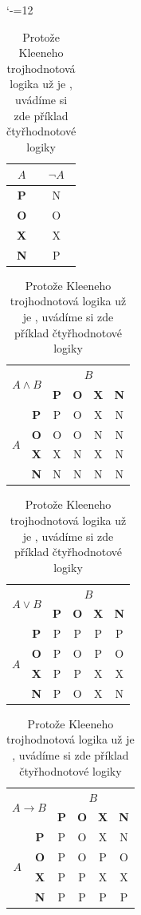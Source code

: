 \documentclass[a4paper, 11pt]{article}
\begin{document}
\begin{table}[h] 
\centering 
\catcode`-=12
\begin{tabular}{|c|c|}
\hline
$A$        & $\neg A$ \\ \hline
\textbf{P} & N        \\ \hline
\textbf{O} & O        \\ \hline
\textbf{X} & X        \\ \hline
\textbf{N} & P        \\ \hline
\end{tabular}
\begin{tabular}{|c|c|c|c|c|c|}
\hline
\multicolumn{2}{|c|}{\multirow{2}{*}{$A \wedge B$}} & \multicolumn{4}{c|}{$B$} \\ \cline{3-6} 
\multicolumn{2}{|c|}{} & \textbf{P} & \textbf{O} & \textbf{X} & \textbf{N} \\ \hline
\multirow{4}{*}{$A$} & \textbf{P} & P & O & X & N \\ \cline{2-6} 
 & \textbf{O} & O & O & N & N \\ \cline{2-6} 
 & \textbf{X} & X & N & X & N \\ \cline{2-6} 
 & \textbf{N} & N & N & N & N \\ \hline
\end{tabular}
\begin{tabular}{|c|c|c|c|c|c|}
\hline
\multicolumn{2}{|c|}{\multirow{2}{*}{$A \vee B$}} & \multicolumn{4}{c|}{$B$} \\ \cline{3-6} 
\multicolumn{2}{|c|}{} & \textbf{P} & \textbf{O} & \textbf{X} & \textbf{N} \\ \hline
\multirow{4}{*}{$A$} & \textbf{P} & P & P & P & P \\ \cline{2-6} 
 & \textbf{O} & P & O & P & O \\ \cline{2-6} 
 & \textbf{X} & P & P & X & X \\ \cline{2-6} 
 & \textbf{N} & P & O & X & N \\ \hline
\end{tabular}
\begin{tabular}{|c|c|c|c|c|c|}
\hline
\multicolumn{2}{|c|}{\multirow{2}{*}{$A \rightarrow B$}} & \multicolumn{4}{c|}{$B$} \\ \cline{3-6} 
\multicolumn{2}{|c|}{} & \textbf{P} & \textbf{O} & \textbf{X} & \textbf{N} \\ \hline
\multirow{4}{*}{$A$} & \textbf{P} & P & O & X & N \\ \cline{2-6} 
 & \textbf{O} & P & O & P & O \\ \cline{2-6} 
 & \textbf{X} & P & P & X & X \\ \cline{2-6} 
 & \textbf{N} & P & P & P & P \\ \hline
\end{tabular}
\caption{\label{tab:tab2}Protože Kleeneho trojhodnotová logika už je , uvádíme si zde příklad čtyřhodnotové logiky}
\end{table}
\end{document}

